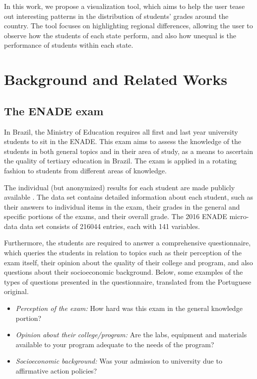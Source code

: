\documentclass{vgtc}                          %
\begin{document}
In this work, we propose a visualization tool, which aims to help the user tease out interesting patterns in the distribution of students' grades around the country. The tool focuses on highlighting regional differences, allowing the user to observe how the students of each state perform, and also how unequal is the performance of students within each state. 



\section{Background and Related Works}

\subsection{The ENADE exam}

In Brazil, the Ministry of Education requires all first and last year university students to sit in the ENADE. This exam aims to assess the knowledge of the students in both general topics and in their area of study, as a means to ascertain the quality of tertiary education in Brazil. The exam is applied in a rotating fashion to students from different areas of knowledge.

The individual (but anonymized) results for each student are made publicly available \cite{enadedados}. The data set contains detailed information about each student, such as their answers to individual items in the exam, their grades in the general and specific portions of the exams, and their overall grade. The 2016 ENADE micro-data data set consists of 216044 entries, each with 141 variables.

Furthermore, the students are required to answer a comprehensive questionnaire, which queries the students in relation to topics such as their perception of the exam itself, their opinion about the quality of their college and program, and also questions about their socioeconomic background. Below, some examples of the types of questions presented in the questionnaire, translated from the Portuguese original.

\begin{itemize}
	\item{\emph{Perception of the exam:} How hard was this exam in the general knowledge portion?}
	\item{\emph{Opinion about their college/program:} Are the labs, equipment and materials available to your program adequate to the needs of the program? }
	\item{\emph{Socioeconomic background:} Was your admission to university due to affirmative action policies?}
\end{itemize}
\end{document}
